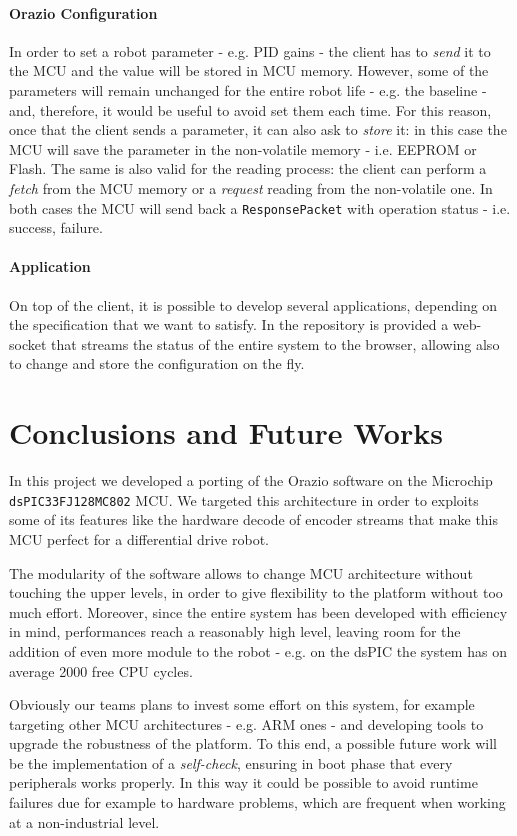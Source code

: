 \documentclass[10pt,a4paper, notitlepage]{report}
\begin{document}
\paragraph{Orazio Configuration} In order to set a robot parameter - e.g. PID gains - the client has to \textit{send} it to the MCU and the value will be stored in MCU memory. However, some of the parameters will remain unchanged for the entire robot life - e.g. the baseline - and, therefore, it would be useful to avoid set them each time. For this reason, once that the client sends a parameter, it can also ask to \textit{store} it: in this case the MCU will save the parameter in the non-volatile memory - i.e. EEPROM or Flash.
The same is also valid for the reading process: the client can perform a \textit{fetch} from the MCU memory or a \textit{request} reading from the non-volatile one. 
In both cases the MCU will send back a \texttt{ResponsePacket} with operation status - i.e. success, failure.

\paragraph{Application} On top of the client, it is possible to develop several applications, depending on the specification that we want to satisfy. In the repository is provided a web-socket that streams the status of the entire system to the browser, allowing also to change and store the configuration on the fly. 

\section*{Conclusions and Future Works} \label{sec:conclusions}
In this project we developed a porting of the Orazio software on the Microchip \texttt{dsPIC33FJ128MC802} MCU. We targeted this architecture in order to exploits some of its features like the hardware decode of encoder streams that make this MCU perfect for a differential drive robot.

The modularity of the software allows to change MCU architecture without touching the upper levels, in order to give flexibility to the platform without too much effort. Moreover, since the entire system has been developed with efficiency in mind, performances reach a reasonably high level, leaving room for the addition of even more module to the robot - e.g. on the dsPIC the system has on average 2000 free CPU cycles.

Obviously our teams plans to invest some effort on this system, for example targeting other MCU architectures - e.g. ARM ones - and developing tools to upgrade the robustness of the platform. To this end, a possible future work will be the implementation of a \textit{self-check}, ensuring in boot phase that every peripherals works properly. In this way it could be possible to avoid runtime failures due for example to hardware problems, which are frequent when working at a non-industrial level.
\end{document}
